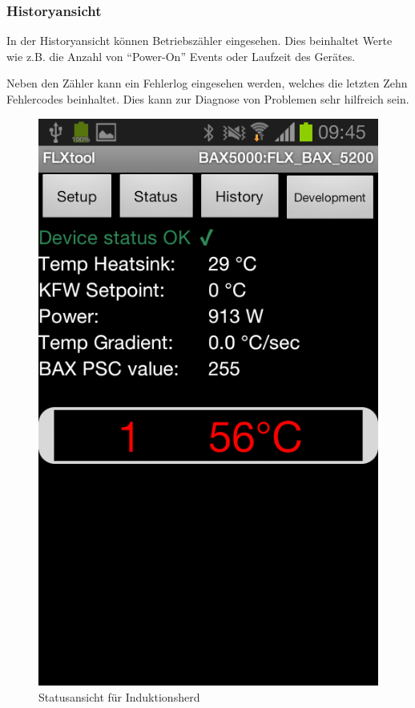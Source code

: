 \subsubsection{Historyansicht}
\label{subsubsec:Ansichten}
In der Historyansicht können Betriebszähler eingesehen. Dies beinhaltet Werte wie z.B. die Anzahl von \enquote{Power-On} Events oder Laufzeit des Gerätes.

Neben den Zähler kann ein Fehlerlog eingesehen werden, welches die letzten Zehn Fehlercodes beinhaltet. Dies kann zur Diagnose von Problemen sehr hilfreich sein.

\begin{figure}
	\includegraphics[scale=0.3]{analysis/res/ShowStatusInduction}
	\caption{Statusansicht für Induktionsherd}
\end{figure}

